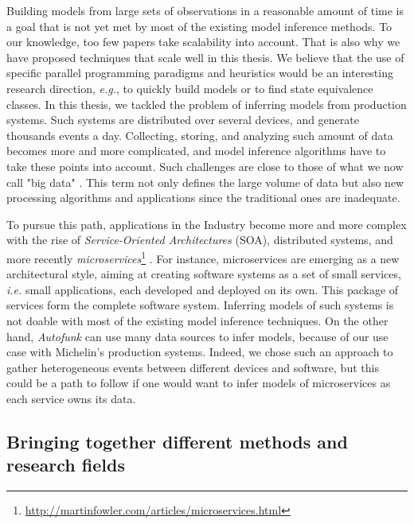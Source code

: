 Building models from large sets of observations in a reasonable
amount of time is a goal that is not yet met by most of the
existing model inference methods. To our knowledge, too few
papers \cite{Yang:2006:PMT:1134285.1134325,Pradel:2009} take
scalability into account. That is also why we have proposed
techniques that scale well in this thesis. We believe that the
use of specific parallel programming paradigms and heuristics
would be an interesting research direction, \emph{e.g.}, to
quickly build models or to find state equivalence classes. In
this thesis, we tackled the problem of inferring models from
production systems.  Such systems are distributed over several
devices, and generate thousands events a day. Collecting,
storing, and analyzing such amount of data becomes more and more
complicated, and model inference algorithms have to take these
points into account. Such challenges are close to those of what
we now call "big data" \cite{bigdata14}. This term not only
defines the large volume of data but also new processing
algorithms and applications since the traditional ones are
inadequate.

To pursue this path, applications in the Industry become more and
more complex with the rise of \emph{Service-Oriented
Architectures} (SOA), distributed systems, and more recently
\emph{microservices}\footnote{\url{http://martinfowler.com/articles/microservices.html}}
\cite{thones2015microservices}.  For instance, microservices are
emerging as a new architectural style, aiming at creating
software systems as a set of small services, \emph{i.e.} small
applications, each developed and deployed on its own. This
package of services form the complete software system. Inferring
models of such systems is not doable with most of the existing
model inference techniques. On the other hand, \textit{Autofunk}
can use many data sources to infer models, because of our use
case with Michelin's production systems. Indeed, we chose such an
approach to gather heterogeneous events between different devices
and software, but this could be a path to follow if one would
want to infer models of microservices as each service owns its
data.

\subsection{Bringing together different methods and research
fields}


